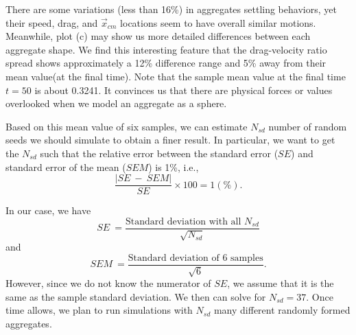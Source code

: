 There are some variations (less than 16\%) in aggregates settling behaviors, yet their speed, drag, and $\vec{x}_{cm}$ locations seem to have overall similar motions. 
Meanwhile, plot (c) may show us more detailed differences between each aggregate shape. 
We find this interesting feature that the drag-velocity ratio spread shows approximately a 12\% difference range and 5\% away from their mean value(at the final time). 
Note that the sample mean value at the final time $t = 50$ is about 0.3241.
It convinces us that there are physical forces or values overlooked when we model an aggregate as a sphere. 
\par
Based on this mean value of six samples, we can estimate $N_{sd}$ number of random seeds we should simulate to obtain a finer result. In particular, we want to get the $N_{sd}$ such that the relative error between the standard error ($SE$) and standard error of the mean ($SEM$) is 1\%, i.e.,
\begin{equation}
	\frac{|SE \ - \ SEM|}{SE} \times 100 = 1 (\%).	
\end{equation}

In our case, we have
\begin{equation}
	SE \ = \frac{\text{Standard deviation with all  } N_{sd}}{\sqrt{N_{sd}}}
\end{equation}
and
\begin{equation}
	SEM \ = \frac{\text{Standard deviation of 6 samples}}{\sqrt{6}}.
\end{equation}
However, since we do not know the numerator of $SE$, we assume that it is the same as the sample standard deviation. We then can solve for $N_{sd} = 37$. Once time allows, we plan to run simulations with $N_{sd}$ many different randomly formed aggregates. 

